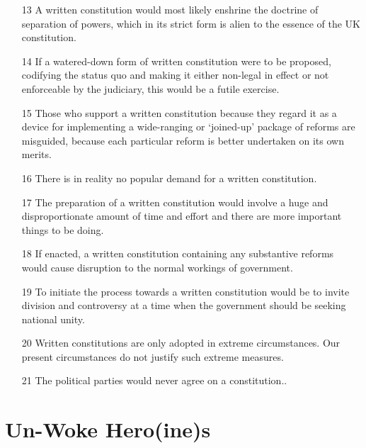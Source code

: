 \documentclass[14pt,titlepage]{extarticle}
\begin{document}
\begin{itemize}
\item[13]
 A written constitution would most likely enshrine the doctrine of
separation of powers, which in its strict form is alien to the essence of the UK
constitution.
  
\item[14]
 If a watered-down form of written constitution were to be proposed,
codifying the status quo and making it either non-legal in effect or not enforceable
by the judiciary, this would be a futile exercise.
  
\item[15]
  Those who support a written constitution because they regard it as a device
  for implementing a wide-ranging or `joined-up' package of reforms are misguided,
  because each particular reform is better undertaken on its own merits.
  
\item[16]
 There is in reality no popular demand for a written constitution.
  
\item[17]
 The preparation of a written constitution would involve a huge and
disproportionate amount of time and effort and there are more important things to be doing.

\item[18]
  If enacted, a written constitution containing any substantive reforms would cause disruption to the normal workings of government.
  
\item[19]
 To initiate the process towards a written constitution would be to invite
division and controversy at a time when the government should be seeking
national unity.
  
\item[20]
  Written constitutions are only adopted in extreme circumstances.
  Our present circumstances do not justify such extreme measures.
  
\item[21]
  The political parties would never agree on a constitution..

\end{itemize}

\pagebreak
\section{Un-Woke Hero(ine)s}\label{heroines}
\end{document}
